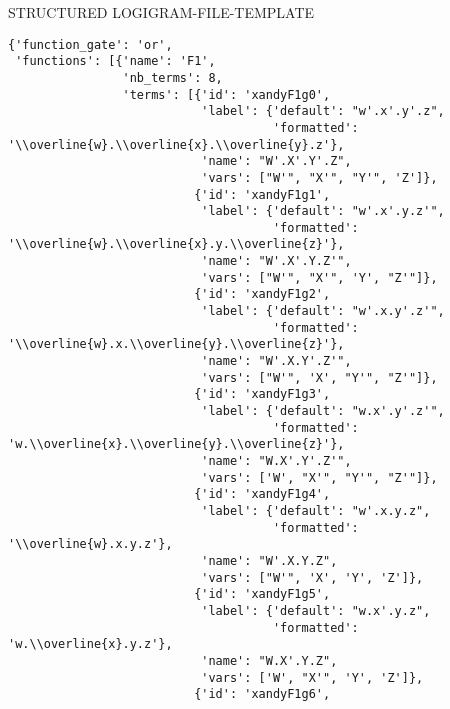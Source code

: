 STRUCTURED LOGIGRAM-FILE-TEMPLATE
\begin{verbatim}
{'function_gate': 'or',
 'functions': [{'name': 'F1',
                'nb_terms': 8,
                'terms': [{'id': 'xandyF1g0',
                           'label': {'default': "w'.x'.y'.z",
                                     'formatted': '\\overline{w}.\\overline{x}.\\overline{y}.z'},
                           'name': "W'.X'.Y'.Z",
                           'vars': ["W'", "X'", "Y'", 'Z']},
                          {'id': 'xandyF1g1',
                           'label': {'default': "w'.x'.y.z'",
                                     'formatted': '\\overline{w}.\\overline{x}.y.\\overline{z}'},
                           'name': "W'.X'.Y.Z'",
                           'vars': ["W'", "X'", 'Y', "Z'"]},
                          {'id': 'xandyF1g2',
                           'label': {'default': "w'.x.y'.z'",
                                     'formatted': '\\overline{w}.x.\\overline{y}.\\overline{z}'},
                           'name': "W'.X.Y'.Z'",
                           'vars': ["W'", 'X', "Y'", "Z'"]},
                          {'id': 'xandyF1g3',
                           'label': {'default': "w.x'.y'.z'",
                                     'formatted': 'w.\\overline{x}.\\overline{y}.\\overline{z}'},
                           'name': "W.X'.Y'.Z'",
                           'vars': ['W', "X'", "Y'", "Z'"]},
                          {'id': 'xandyF1g4',
                           'label': {'default': "w'.x.y.z",
                                     'formatted': '\\overline{w}.x.y.z'},
                           'name': "W'.X.Y.Z",
                           'vars': ["W'", 'X', 'Y', 'Z']},
                          {'id': 'xandyF1g5',
                           'label': {'default': "w.x'.y.z",
                                     'formatted': 'w.\\overline{x}.y.z'},
                           'name': "W.X'.Y.Z",
                           'vars': ['W', "X'", 'Y', 'Z']},
                          {'id': 'xandyF1g6',

\end{verbatim}
